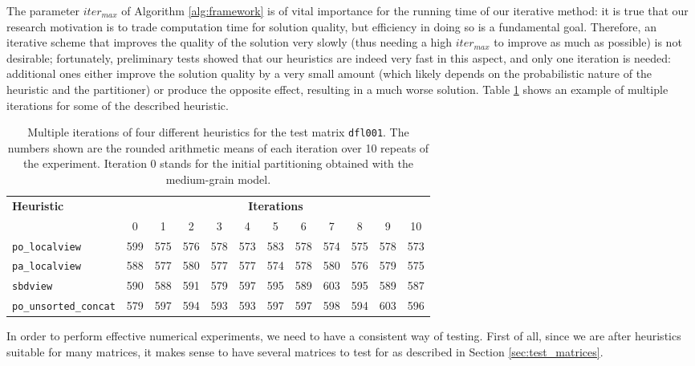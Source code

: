 The parameter $iter_{max}$ of Algorithm \ref{alg:framework} is of vital importance for the running time of our iterative method: it is true that our research motivation is to trade computation time for solution quality, but efficiency in doing so is a fundamental goal. Therefore, an iterative scheme that improves the quality of the solution very slowly (thus needing a high $iter_{max}$ to improve as much as possible) is not desirable; fortunately, preliminary tests showed that our heuristics are indeed very fast in this aspect, and only one iteration is needed: additional ones either improve the solution quality by a very small amount (which likely depends on the probabilistic nature of the heuristic and the partitioner) or produce the opposite effect, resulting in a much worse solution. Table \ref{tab:iterations} shows an example of multiple iterations for some of the described heuristic.

\begin{table}[h]
	\centering
	\begin{tabular}{|l|c||c|c|c|c|c|c|c|c|c|c|}
		\hline
		\multirow{2}{*}{\textbf{Heuristic}} & \multicolumn{11}{c|}{\textbf{Iterations}} \\ \cline{2-12} 
		& 0 & 1 & 2 & 3 & 4 & 5 & 6 & 7 & 8 & 9 & 10 \\ \hline
		\verb|po_localview| & 599 & 575 & 576 & 578 & 573 & 583 & 578 & 574 & 575 & 578 & 573 \\
		\verb|pa_localview| & 588 & 577 & 580 & 577 & 577 & 574 & 578 & 580 & 576 & 579 & 575  \\
		\verb|sbdview| & 590 & 588 & 591 & 579 & 597 & 595 & 589 & 603 & 595 & 589 & 587 \\
		\verb|po_unsorted_concat| & 579 & 597 & 594 & 593 & 593 & 597 & 597 & 598 & 594 & 603 & 596 \\ 
		\hline
	\end{tabular}
	\caption{Multiple iterations of four different heuristics for the test matrix \texttt{dfl001}. The numbers shown are the rounded arithmetic means of each iteration over 10 repeats of the experiment. Iteration 0 stands for the initial partitioning obtained with the medium-grain model. } \label{tab:iterations}
\end{table}

In order to perform effective numerical experiments, we need to have a consistent way of testing. First of all, since we are after heuristics suitable for many matrices, it makes sense to have several matrices to test for as described in Section \ref{sec:test_matrices}. 

